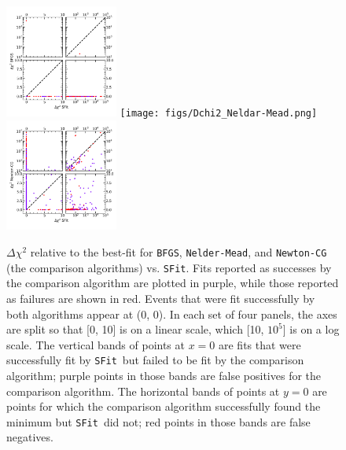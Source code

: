 \documentclass[preprint]{aastex631}
\newcommand{\neldarmead}{\texttt{Nelder-Mead}}
\newcommand{\newtoncg}{\texttt{Newton-CG}}
\newcommand{\bfgs}{\texttt{BFGS}}
\newcommand{\sfit}{\texttt{SFit}}
\begin{document}
\begin{figure}
	\includegraphics[width=0.33\textwidth]{figs/Dchi2_BFGS.png}
	\texttt{[image: figs/Dchi2\_Neldar-Mead.png]}
	\includegraphics[width=0.33\textwidth]{figs/Dchi2_Newton-CG.png}
	\caption{$\Delta\chi^2$ relative to the best-fit for \bfgs, \neldarmead, and \newtoncg\, (the comparison algorithms)  vs. \sfit. Fits reported as successes by the comparison algorithm are plotted in purple, while those reported as failures are shown in red. Events that were fit successfully by both algorithms appear at (0, 0). In each set of four panels, the axes are split so that [0, 10] is on a linear scale, which [10, $10^5$] is on a log scale. The vertical bands of points at $x=0$ are fits that were successfully fit by \sfit\, but failed to be fit by the comparison algorithm; purple points in those bands are false positives for the comparison algorithm. The horizontal bands of points at $y=0$ are points for which the comparison algorithm successfully found the minimum but \sfit\, did not; red points in those bands are false negatives. 
	 \label{fig:dchi2}}
\end{figure}
\end{document}
